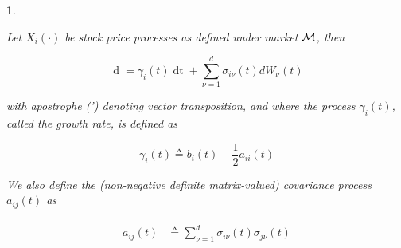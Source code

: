 \documentclass[british]{amsart} \usepackage{lmodern}
\numberwithin{equation}{section} \numberwithin{figure}{section}
\theoremstyle{plain} \newtheorem{thm}{\protect\theoremname}[section]
\theoremstyle{definition} \newtheorem{defn}[thm]{\protect\definitionname}
\theoremstyle{plain} \newtheorem{assumption}[thm]{\protect\assumptionname}
\theoremstyle{plain} \newtheorem{lem}[thm]{\protect\lemmaname}
\theoremstyle{plain} \newtheorem{prop}[thm]{\protect\propositionname}
\theoremstyle{remark} \newtheorem{rem}[thm]{\protect\remarkname}
\theoremstyle{plain} \newtheorem{cor}[thm]{\protect\corollaryname}
\renewcommand{\d}[1]{\mathop{\mathrm{d}{#1}}}
\newcommand{\defeq}{\mathop{\triangleq}} \newcommand{\almostsurely}{\text{a.s.}}
\begin{document}
\begin{prop}
  \cite{fernholz1999pgf}
  \label{thm:logarithmicrepresentation}

  Let $X_{i}(\cdot)$ be stock price processes as defined under market $\mathcal{M}$,
  then

  \begin{equation}
    \label{eq:dlogX}
        \d{\log{X_{i}(t)}} =
          \gamma_{i}(t) \d{t} +
          \sum_{\nu=1}^{d} \sigma_{i\nu}(t) dW_{\nu}(t)
  \end{equation}

  with apostrophe (') denoting vector transposition, and where the process
  $\gamma_{i}(t)$, called the \textit{growth rate}, is defined as

  \begin{equation}
    \label{eq:gamma}
    \gamma_{i}(t)\defeq b_{i}(t)-\frac{1}{2}a_{ii}(t)
  \end{equation}

  We also define the (non-negative definite matrix-valued) \textit{covariance
  process} $a_{ij}(t)$ as

  \begin{gather}
    \label{eq:covarianceprocess}
    \begin{split}
      a_{ij}(t)
        & \defeq \sum_{\nu=1}^{d}\sigma_{i\nu}(t)\sigma_{j\nu}(t) 
    \end{split}
  \end{gather}

\end{prop}
\end{document}

